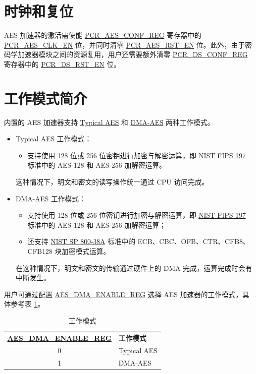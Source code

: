 \documentclass[main\_\_CN.tex]{subfiles}
\begin{document}
\section{时钟和复位}
AES 加速器的激活需使能 \hyperref[regdesc:PCRAESCONFREG]{PCR\_AES\_CONF\_REG} 寄存器中的 \hyperref[fielddesc:PCRAESCLKEN]{PCR\_AES\_CLK\_EN} 位，并同时清零 \hyperref[fielddesc:PCRAESRSTEN]{PCR\_AES\_RST\_EN} 位。此外，由于密码学加速器模块之间的资源复用，用户还需要额外清零 \hyperref[regdesc:PCRDSCONFREG]{PCR\_DS\_CONF\_REG} 寄存器中的 \hyperref[fielddesc:PCRDSRSTEN]{PCR\_DS\_RST\_EN} 位。



\section{工作模式简介}

\chipname{} 内置的 AES 加速器支持 \hyperref[sec:aes-typical-modes]{Typical AES} 和 \hyperref[sec:aes-dma-aes]{DMA-AES} 两种工作模式。

\begin{itemize}
    \item Typical AES 工作模式：
    \begin{itemize}
        \item 支持使用 128 位或 256 位密钥进行加密与解密运算，即 \href{https://nvlpubs.nist.gov/nistpubs/FIPS/NIST.FIPS.197.pdf}{NIST FIPS 197} 标准中的 AES-128 和 AES-256  加解密运算。
    \end{itemize}
    这种情况下，明文和密文的读写操作统一通过 CPU 访问完成。
    \item DMA-AES 工作模式：
    \begin{itemize}
        \item 支持使用 128 位或 256 位密钥进行加密与解密运算，即 \href{https://nvlpubs.nist.gov/nistpubs/FIPS/NIST.FIPS.197.pdf}{NIST FIPS 197} 标准中的 AES-128 和 AES-256 加解密运算；
        \item 还支持 \href{https://nvlpubs.nist.gov/nistpubs/Legacy/SP/nistspecialpublication800-38a.pdf}{NIST SP 800-38A} 标准中的 ECB、CBC、OFB、CTR、CFB8、CFB128 块加密模式运算。
    \end{itemize}
    在这种情况下，明文和密文的传输通过硬件上的 DMA 完成，运算完成时会有中断发生。
\end{itemize}

用户可通过配置 \hyperref[regdesc:AESDMAENABLEREG]{AES\_DMA\_ENABLE\_REG} 选择 AES 加速器的工作模式，具体参考表 \ref{tab:aes-dma-enable}。

\begin{longtable}[c]{ |c|l| }
\caption{工作模式}
\label{tab:aes-dma-enable}
\\\hline
\rowcolor{lightgray}
\textbf{\hyperref[regdesc:AESDMAENABLEREG]{AES\_DMA\_ENABLE\_REG}}       & \textbf{工作模式}\\
    \hline
    0           & Typical AES    \\
    \hline
    1           & DMA-AES        \\
    \hline
\end{longtable}
\end{document}
